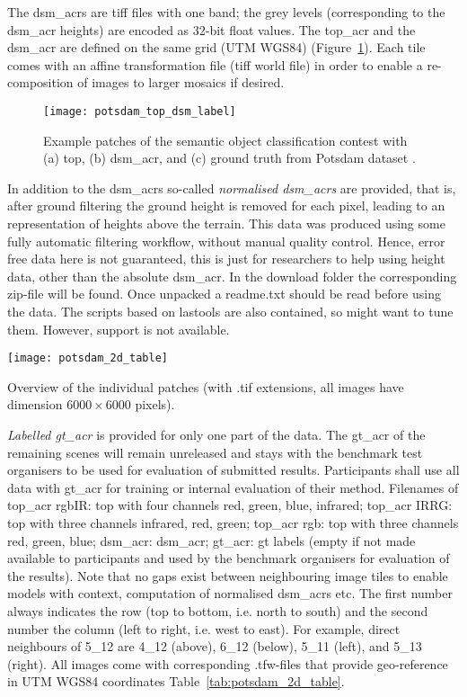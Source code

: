 The \acrshort{dsm_acr}s are \acrshort{tiff} files with one band; the grey levels
(corresponding to the \acrshort{dsm_acr} heights) are encoded as 32-bit float
values. The \acrshort{top_acr} and the \acrshort{dsm_acr} are defined on the
same grid (UTM WGS84) (Figure~\ref{fig:potsdam_top_dsm_label}). Each tile comes
with an affine transformation file (tiff world file) in order to enable a
re-composition of images to larger mosaics if desired.
\begin{figure}
    \centering
    \texttt{[image: potsdam\_top\_dsm\_label]}
    \caption{Example patches of the semantic object classification contest with
    (a) \gls{top}, (b) \acrshort{dsm_acr}, and (c) ground truth from Potsdam
    dataset \cite{potsdam_isprs}.}
    \label{fig:potsdam_top_dsm_label}
\end{figure}


In addition to the \acrshort{dsm_acr}s so-called \emph{normalised
\acrshort{dsm_acr}s} are provided, that is, after ground filtering the ground
height is removed for each pixel, leading to an representation of heights above
the terrain. This data was produced using some fully automatic filtering
workflow, without manual quality control. Hence, error free data here is not
guaranteed, this is just for researchers to help using height data, other than
the absolute \acrshort{dsm_acr}. In the download folder the corresponding
zip-file will be found. Once unpacked a readme.txt should be read before using
the data. The scripts based on lastools are also contained, so 
might want to tune them. However, support is not available.


\begin{table}[h]
    \centering
    \texttt{[image: potsdam\_2d\_table]}
    \caption{Overview of the individual patches (with .tif extensions,
    all images have dimension $6000 \times 6000$ pixels).}
    \label{tab:potsdam_2d_table}
\end{table}

\emph{Labelled \acrfull{gt_acr}} is provided for only one part of the data. The
\acrshort{gt_acr} of the remaining scenes will remain unreleased and stays with
the benchmark test organisers to be used for evaluation of submitted results.
Participants shall use all data with \acrshort{gt_acr} for training or internal
evaluation of their method. Filenames of \acrshort{top_acr} \acrshort{rgb}IR:
\gls{top} with four channels red, green, blue, infrared;
\acrshort{top_acr} IRRG: \gls{top} with three channels infrared, red,
green; \acrshort{top_acr} \acrshort{rgb}: \gls{top} with three channels
red, green, blue; \acrshort{dsm_acr}: \acrfull{dsm_acr}; \acrshort{gt_acr}:
\gls{gt} labels (empty if not made available to participants and used by the
benchmark organisers for evaluation of the results). Note that no gaps exist
between neighbouring image tiles to enable models with context, 
computation of normalised \acrshort{dsm_acr}s etc. The first number always
indicates the row (top to bottom, i.e. north to south) and the second number
the column (left to right, i.e. west to east). For example, direct neighbours
of 5\_12 are 4\_12 (above), 6\_12 (below), 5\_11 (left), and 5\_13 (right). All
images come with corresponding .tfw-files that provide geo-reference in UTM
WGS84 coordinates Table~\ref{tab:potsdam_2d_table}.
